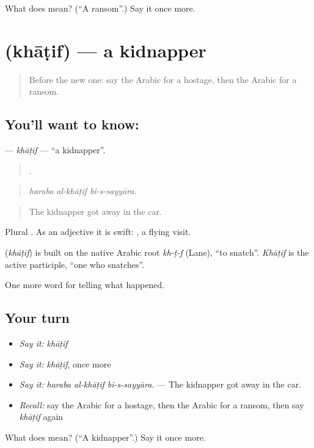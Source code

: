 \begin{tcolorbox}[breakable,colback=teal!4,colframe=teal!35!black,title={Before you move on}]
What does  mean? (\textquotedblleft{}A ransom\textquotedblright{}.) Say it once more.
\end{tcolorbox}
\section[\texorpdfstring{\ar{خاطف} (khāṭif)}{خاطف (khāṭif)}]{ (khāṭif) — a kidnapper}

\label{lesson:AR-C347-khatif}



\begin{quote}
Before the new one: say the Arabic for a hostage, then the Arabic for a ransom.
\end{quote}

\subsection*{You'll want to know: }
\textbf{} — \emph{khāṭif} — \textquotedblleft{}a kidnapper\textquotedblright{}.

\begin{quote}
  .
\end{quote}

\begin{quote}
\emph{haraba al-khāṭif bi-s-sayyāra.}
\end{quote}

\begin{quote}
The kidnapper got away in the car.
\end{quote}

Plural . As an adjective it is swift:  , a flying visit.

\begin{cousinweb}
\textbf{} (\emph{khāṭif}) is built on the native Arabic root \emph{kh-ṭ-f} (Lane), \textquotedblleft{}to snatch\textquotedblright{}. \emph{Khāṭif} is the active participle, \textquotedblleft{}one who snatches\textquotedblright{}.
\end{cousinweb}

\begin{grammarlens}[title={What you've built}]
One more word for telling what happened.
\end{grammarlens}

\subsection*{Your turn}
\begin{itemize}
\raggedright
  \item \emph{Say it:} \emph{khāṭif}
  \item \emph{Say it:} \emph{khāṭif}, once more
  \item \emph{Say it:} \emph{haraba al-khāṭif bi-s-sayyāra.} — The kidnapper got away in the car.
  \item \emph{Recall:} say the Arabic for a hostage, then the Arabic for a ransom, then say \emph{khāṭif} again
\end{itemize}

\begin{tcolorbox}[breakable,colback=teal!4,colframe=teal!35!black,title={Before you move on}]
What does  mean? (\textquotedblleft{}A kidnapper\textquotedblright{}.) Say it once more.
\end{tcolorbox}
